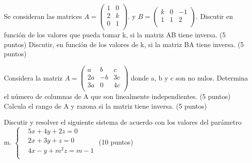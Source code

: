 \documentclass[addpoints,spanish, 12pt,a4paper]{exam}
\begin{document}
\begin{questions}
\question Se consideran las matrices $A=\left( \begin{matrix}
   1 & 0  \\
   2 & k  \\
   0 & 1  \\
\end{matrix} \right)$. y $B=\left( \begin{matrix}
   k & 0 & -1  \\
   1 & 1 & 2  \\
\end{matrix} \right)$.
Discutir en función de los valores que pueda tomar k, si la matriz AB tiene inversa.	(5 puntos)
Discutir, en función de los valores de k, si la matriz BA tiene inversa.	(5 puntos)

\question Considera la matriz $A=\left( \begin{matrix}
   a & b & c  \\
   2a & -b & 3c  \\
   3a & 0 & 4c  \\
\end{matrix} \right)$ donde a, b y c son no nulos.
Determina el número de columnas de A que son linealmente independientes.	(5 puntos)
	Calcula el rango de A y razona si la matriz tiene inversa.	(5 puntos)


\question Discutir y resolver el siguiente sistema de acuerdo con los valores del parámetro m.
	$\left\{ \begin{matrix}
  & 5x+4y+2z=0 \\ 
 & 2x+3y+z=0 \\ 
 & 4x-y+{{m}^{2}}z=m-1 \\ 
\end{matrix} \right.$	(10 puntos)


\addpoints




\end{questions}
\end{document}

